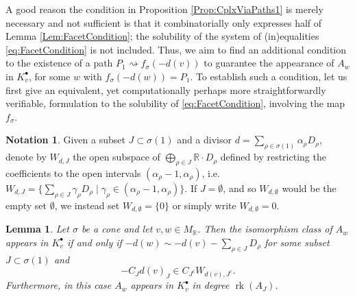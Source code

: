 \documentclass[reqno, 12pt]{amsart}
\newtheorem{lemma}[theorem]{Lemma}
\theoremstyle{definition}
\newtheorem{notation}[theorem]{Notation}
\numberwithin{equation}{section}
\newcommand{\R}{\mathbb{R}}
\begin{document}
A good reason the condition in Proposition \ref{Prop:CplxViaPaths1} is merely necessary and not sufficient is that it combinatorially only expresses half of Lemma \ref{Lem:FacetCondition}; the solubility of the system of (in)equalities \eqref{eq:FacetCondition} is not included. Thus, we aim to find an additional condition to the existence of a path $P_1\rightsquigarrow f_\sigma(-d(v))$ to guarantee the appearance of $A_w$ in $K_v^\bullet$, for some $w$ with $f_\sigma(-d(w))=P_1$. 
To establish such a condition, let us first give an equivalent, yet computationally perhaps more straightforwardly verifiable, formulation to the solubility of \eqref{eq:FacetCondition}, involving the map $f_{\sigma}$.
\begin{notation}
    \label{Not:Matrixsplitting}
    Given a subset $J\subset \sigma(1)$ and a divisor $d=\sum_{\rho\in \sigma(1)} \alpha_\rho D_\rho$, denote by $W_{d,J}$ the open subspace of $\bigoplus_{\rho\in J}\R\cdot D_\rho$ defined by restricting the coefficients to the open intervals $(\alpha_\rho-1,\alpha_\rho)$, i.e. $W_{d,J}=\{\sum_{\rho\in J}\gamma_\rho D_\rho\mid \gamma_\rho\in (\alpha_\rho-1,\alpha_\rho)\}$. If $J=\emptyset$, and so $W_{d,\emptyset}$ would be the empty set $\emptyset$, we instead set $W_{d,\emptyset}=\{0\}$ or simply write $W_{d,\emptyset}=0$.
\end{notation}

\begin{lemma}
    \label{Lem:FacetSufficientMatrix}
    Let $\sigma$ be a cone and let $v,w\in M_\R$. Then the isomorphism class of $A_w$ appears in $K_v^\bullet$ if and only if $-d(w)\sim -d(v)-\sum_{\rho\in J}D_\rho$ for some subset $J\subset \sigma(1)$ and \begin{equation}\label{eq:EquivFacet}
    -C_Jd(v)_{J}\in C_{J^c}W_{d(v),J^c}.
    \end{equation}
    Furthermore, in this case $A_w$ appears in $K_v^\bullet$ in degree $\operatorname{rk}(A_J)$.
\end{lemma}
\end{document}
